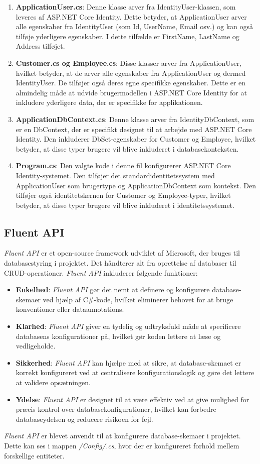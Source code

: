 \begin{enumerate}
\item \textbf{ApplicationUser.cs}: Denne klasse arver fra IdentityUser-klassen, som leveres af ASP.NET Core Identity. Dette betyder, at ApplicationUser arver alle egenskaber fra IdentityUser (som Id, UserName, Email osv.) og kan også tilføje yderligere egenskaber. I dette tilfælde er FirstName, LastName og Address tilføjet.
\item \textbf{Customer.cs og Employee.cs}: Disse klasser arver fra ApplicationUser, hvilket betyder, at de arver alle egenskaber fra ApplicationUser og dermed IdentityUser. De tilføjer også deres egne specifikke egenskaber. Dette er en almindelig måde at udvide brugermodellen i ASP.NET Core Identity for at inkludere yderligere data, der er specifikke for applikationen.
\item \textbf{ApplicationDbContext.cs}: Denne klasse arver fra IdentityDbContext, som er en DbContext, der er specifikt designet til at arbejde med ASP.NET Core Identity. Den inkluderer DbSet-egenskaber for Customer og Employee, hvilket betyder, at disse typer brugere vil blive inkluderet i databasekonteksten.
\item \textbf{Program.cs}: Den valgte kode i denne fil konfigurerer ASP.NET Core Identity-systemet. Den tilføjer det standardidentitetssystem med ApplicationUser som brugertype og ApplicationDbContext som kontekst. Den tilføjer også identitetskernen for Customer og Employee-typer, hvilket betyder, at disse typer brugere vil blive inkluderet i identitetssystemet.
\end{enumerate}

\subsection{Fluent API}
\emph{Fluent API} er et open-source framework udviklet af Microsoft, der bruges til databasestyring i projektet. Det håndterer alt fra oprettelse af databaser til CRUD-operationer.  \emph{Fluent API} inkluderer følgende funktioner:
\begin{itemize}
\item \textbf{Enkelhed}: \emph{Fluent API} gør det nemt at definere og konfigurere database-skemaer ved hjælp af C\#-kode, hvilket eliminerer behovet for at bruge konventioner eller dataannotations.
\item \textbf{Klarhed}: \emph{Fluent API} giver en tydelig og udtryksfuld måde at specificere databasens konfigurationer på, hvilket gør koden lettere at læse og vedligeholde.
\item \textbf{Sikkerhed}: \emph{Fluent API} kan hjælpe med at sikre, at database-skemaet er korrekt konfigureret ved at centralisere konfigurationslogik og gøre det lettere at validere opsætningen.
\item \textbf{Ydelse}: \emph{Fluent API} er designet til at være effektiv ved at give mulighed for præcis kontrol over databasekonfigurationer, hvilket kan forbedre databaseydelsen og reducere risikoen for fejl.
\end{itemize}
\emph{Fluent API} er blevet anvendt til at konfigurere database-skemaer i projektet. Dette kan ses i mappen \emph{/Config/.cs}, hvor der er konfigureret forhold mellem forskellige entiteter.

